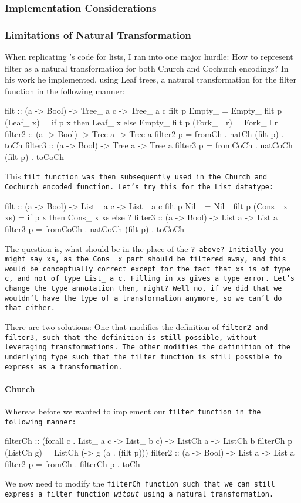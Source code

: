 \subsubsection{Implementation Considerations}
\subsubsection{Limitations of Natural Transformation}
When replicating \cite{Harper2011}'s code for lists, I ran into one major hurdle:
How to represent filter as a natural transformation for both Church and Cochurch encodings?
In his work he implemented, using Leaf trees, a natural transformation for the filter function in the following manner:
\begin{code}
filt :: (a -> Bool) -> Tree_ a c -> Tree_ a c
filt p Empty_ = Empty_
filt p (Leaf_ x) = if p x then Leaf_ x else Empty_
filt p (Fork_ l r) = Fork_ l r
filter2 :: (a -> Bool) -> Tree a -> Tree a
filter2 p = fromCh . natCh (filt p) . toCh
filter3 :: (a -> Bool) -> Tree a -> Tree a
filter3 p = fromCoCh . natCoCh (filt p) . toCoCh
\end{code}
This \tt{filt} function was then subsequently used in the Church and Cochurch encoded function.
Let's try this for the \tt{List} datatype:
\begin{code}
filt :: (a -> Bool) -> List_ a c -> List_ a c
filt p Nil_ = Nil_
filt p (Cons_ x xs) = if p x then Cons_ x xs else ? 
filter3 :: (a -> Bool) -> List a -> List a
filter3 p = fromCoCh . natCoCh (filt p) . toCoCh
\end{code}
The question is, what should be in the place of the \tt{?} above?
Initially you might say \tt{xs}, as the \tt{Cons\_ x} part should be filtered away, and this would be conceptually correct except for the fact that \tt{xs} is of type \tt{c}, and not of type \tt{List\_ a c}.
Filling in \tt{xs} gives a type error.
Let's change the type annotation then, right?
Well no, if we did that we wouldn't have the type of a transformation anymore, so we can't do that either.

There are two solutions:
One that modifies the definition of \tt{filter2} and \tt{filter3}, such that the definition is still possible, without leveraging transformations.
The other modifies the definition of the underlying type such that the filter function is still possible to express as a transformation.
    
\paragraph{Church}
Whereas before we wanted to implement our \tt{filter} function in the following manner:
\begin{code}
filterCh :: (forall c . List_ a c -> List_ b c) -> ListCh a -> ListCh b
filterCh p (ListCh g) = ListCh (\a -> g (a . (filt p)))
filter2 :: (a -> Bool) -> List a -> List a
filter2 p = fromCh . filterCh p . toCh
\end{code}
We now need to modify the \tt{filterCh} function such that we can still express a filter function \textit{witout} using a natural transformation.

